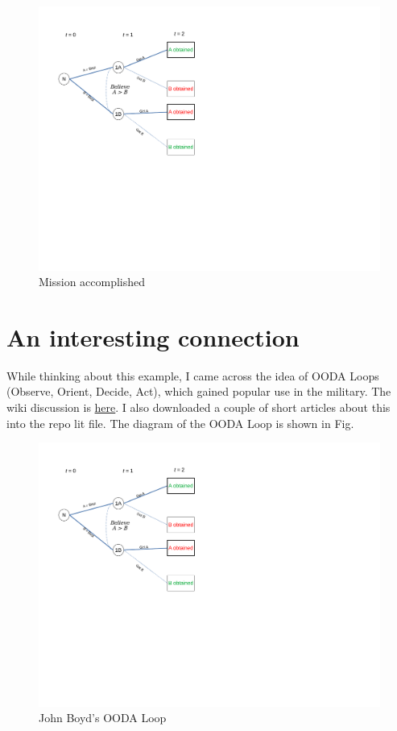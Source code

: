 \documentclass[
11pt,
titlepage,
reqno,
]{article}%
\theoremstyle{definition}
\begin{document}
\begin{figure}[h!]
	\centering
	\includegraphics*[page=13,trim = 0in 5in 3in 0in,scale=.65]{Awareness_Diagrams_All}
	\caption{Mission accomplished\label{Diag: p-13}}%
\end{figure}


\section*{An interesting connection}
While thinking about this example, I came across the idea of OODA Loops (Observe, Orient, Decide, Act), which gained popular use in the military. The wiki discussion is \href{https://en.wikipedia.org/wiki/OODA_loop}{here}. I also downloaded a couple of short articles about this into the repo lit file. The diagram of the OODA Loop  is shown in Fig. 

\begin{figure}[h!]
	\centering
	\includegraphics*[page=14,trim = 0in 2in 0in 0in,scale=.65]{Awareness_Diagrams_All}
	\caption{John Boyd's OODA Loop\label{Diag: p-14}}%
\end{figure}
\end{document}

